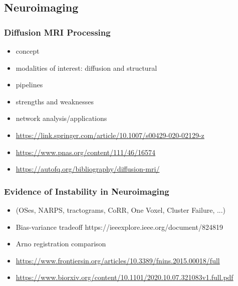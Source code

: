 \subsection{Neuroimaging}

\subsubsection{Diffusion MRI Processing}
\begin{itemize}
\item concept
\item modalities of interest: diffusion and structural
\item pipelines
\item strengths and weaknesses
\item network analysis/applications
\item \url{https://link.springer.com/article/10.1007/s00429-020-02129-z}
\item \url{https://www.pnas.org/content/111/46/16574}
\item \url{https://autofq.org/bibliography/diffusion-mri/}
\end{itemize}

\subsubsection{Evidence of Instability in Neuroimaging}
\begin{itemize}
\item (OSes, NARPS, tractograms, CoRR, One Voxel, Cluster Failure, ...)
\item Bias-variance tradeoff https://ieeexplore.ieee.org/document/824819
\item Arno registration comparison
\item \url{https://www.frontiersin.org/articles/10.3389/fnins.2015.00018/full}
\item \url{https://www.biorxiv.org/content/10.1101/2020.10.07.321083v1.full.pdf}
\end{itemize}

